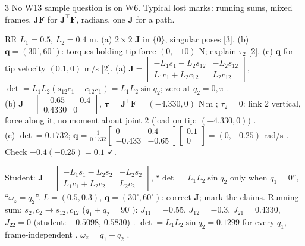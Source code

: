 \begin{multicols}{3}
No W13 sample question is on W6. Typical lost marks: running sums, mixed frames, $\mathbf J\mathbf F$ for $\mathbf J^\top\mathbf F$, radians, one $\mathbf J$ for a path.
\begin{examq}
RR $L_1=0.5$, $L_2=0.4$ m. (a) $2\times2$ $\mathbf J$ in $\{0\}$, singular poses [3]. (b) $\mathbf q=(30^\circ,60^\circ)$: torques holding tip force $(0,-10)$ N; explain $\tau_2$ [2]. (c) $\dot{\mathbf q}$ for tip velocity $(0.1,0)$ m/s [2].
\solution
(a) $\mathbf J=\begin{bmatrix}-L_1s_1-L_2s_{12}&-L_2s_{12}\\L_1c_1+L_2c_{12}&L_2c_{12}\end{bmatrix}$, $\det=L_1L_2(s_{12}c_1-c_{12}s_1)=L_1L_2\sin q_2$; zero at $q_2=0,\pi$ .\\
(b) $\mathbf J=\begin{bmatrix}-0.65&-0.4\\0.4330&0\end{bmatrix}$, $\boldsymbol\tau=\mathbf J^\top\mathbf F=(-4.330,0)$ N\,m ; $\tau_2=0$: link 2 vertical, force along it, no moment about joint 2 (load on tip: $(+4.330,0)$) .\\
(c) $\det=0.1732$; $\dot{\mathbf q}=\frac1{0.1732}\begin{bmatrix}0&0.4\\-0.433&-0.65\end{bmatrix}\begin{bmatrix}0.1\\0\end{bmatrix}=(0,-0.25)$ rad/s . Check $-0.4(-0.25)=0.1$ ✓. \chk
\end{examq}
\begin{examq}
Student: $\mathbf J=\begin{bmatrix}-L_1s_1-L_2s_2&-L_2s_2\\L_1c_1+L_2c_2&L_2c_2\end{bmatrix}$, ``$\det=L_1L_2\sin q_2$ only when $q_1=0$'', ``$\omega_z=\dot q_2$''. $L=(0.5,0.3)$, $\mathbf q=(30^\circ,60^\circ)$: correct $\mathbf J$; mark the claims.
\solution
Running sum: $s_2,c_2\to s_{12},c_{12}$ ($q_1{+}q_2=90^\circ$): $J_{11}=-0.55$, $J_{12}=-0.3$, $J_{21}=0.4330$, $J_{22}=0$ (student: $-0.5098$, $0.5830$) . $\det=L_1L_2\sin q_2=0.1299$ for every $q_1$, frame-independent . $\omega_z=\dot q_1+\dot q_2$ . \chk
\end{examq}
\begin{examq}

\end{examq}
\end{multicols}

